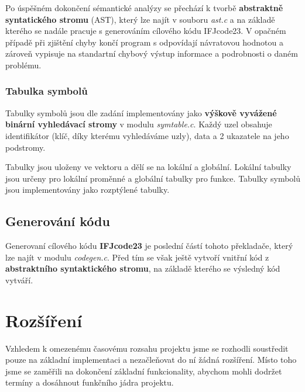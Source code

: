 \documentclass[a4paper, 12pt]{article} %
\begin{document}
            Po úspěšném dokončení sémantické
            analýzy se přechází k tvorbě \textbf{abstraktně syntatického stromu} (AST), který lze najít v
            souboru \textit{ast.c} a na základě kterého se nadále pracuje s generováním cílového kódu IFJcode23.
            V opačném případě při zjištění chyby končí program s odpovídají návratovou hodnotou a
            zároveň vypisuje na standartní chybový výstup informace a podrobnosti o daném problému.


            \subsubsection{Tabulka symbolů}
                Tabulky symbolů jsou dle zadání implementovány jako \textbf{výškově vyvážené binární
                vyhledávací stromy}
                v modulu \textit{symtable.c}. Každý uzel obsahuje identifikátor (klíč, díky kterému
                vyhledáváme uzly), data a 2 ukazatele na jeho podstromy.

                Tabulky jsou uloženy ve vektoru a dělí se na lokální a globální. Lokální tabulky jsou
                určeny pro lokální proměnné a globální tabulky pro funkce. Tabulky symbolů jsou
                implementovány jako rozptýlené tabulky.

        \subsection{Generování kódu}\label{codegen}
            Generovaní cílového kódu \textbf{IFJcode23} je poslední částí tohoto překladače, který lze najít
            v modulu \textit{codegen.c}. Před tím se však ještě vytvoří vnitřní kód z \textbf{abstraktního syntaktického
            stromu}, na základě kterého se výsledný kód vytváří.

        \section{Rozšíření}
            Vzhledem k omezenému časovému rozsahu projektu jsme se rozhodli soustředit pouze na
            základní implementaci a nezačleňovat do ní žádná rozšíření. Místo toho jsme se zaměřili
            na dokončení základní funkcionality, abychom mohli dodržet termíny a dosáhnout funkčního
            jádra projektu.
\end{document}

